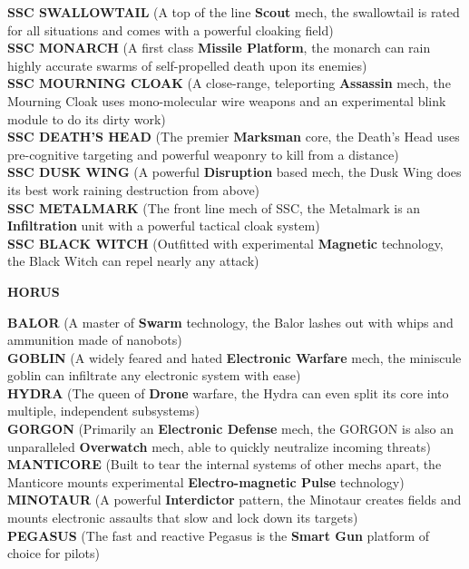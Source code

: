 \textbf{SSC SWALLOWTAIL} (A top of the line \textbf{Scout} mech, the swallowtail is rated for all situations and comes with a powerful cloaking field)\\
\textbf{SSC MONARCH} (A first class \textbf{Missile Platform}, the monarch can rain highly accurate swarms of self-propelled death upon its enemies)\\
\textbf{SSC MOURNING CLOAK} (A close-range, teleporting \textbf{Assassin} mech, the Mourning Cloak uses mono-molecular wire weapons and an experimental blink module to do its dirty work)\\
\textbf{SSC DEATH’S HEAD} (The premier \textbf{Marksman} core, the Death’s Head uses pre-cognitive targeting and powerful weaponry to kill from a distance)\\
\textbf{SSC DUSK WING} (A powerful \textbf{Disruption} based mech, the Dusk Wing does its best work raining destruction from above)\\
\textbf{SSC METALMARK} (The front line mech of SSC, the Metalmark is an \textbf{Infiltration} unit with a powerful tactical cloak system)\\
\textbf{SSC BLACK WITCH} (Outfitted with experimental \textbf{Magnetic} technology, the Black Witch can repel nearly any attack)

\begin{center}
  \textbf{HORUS}
\end{center}  

\textbf{BALOR} (A master of \textbf{Swarm} technology, the Balor lashes out with whips and ammunition made of nanobots)\\
\textbf{GOBLIN} (A widely feared and hated \textbf{Electronic Warfare} mech, the miniscule goblin can infiltrate any electronic system with ease)\\
\textbf{HYDRA} (The queen of \textbf{Drone} warfare, the Hydra can even split its core into multiple, independent subsystems)\\
\textbf{GORGON} (Primarily an \textbf{Electronic Defense} mech, the GORGON is also an unparalleled \textbf{Overwatch} mech, able to quickly neutralize incoming threats)\\
\textbf{MANTICORE} (Built to tear the internal systems of other mechs apart, the Manticore mounts experimental \textbf{Electro-magnetic Pulse} technology)\\
\textbf{MINOTAUR} (A powerful \textbf{Interdictor} pattern, the Minotaur creates fields and mounts electronic assaults that slow and lock down its targets)\\
\textbf{PEGASUS} (The fast and reactive Pegasus is the \textbf{Smart Gun} platform of choice for pilots)

